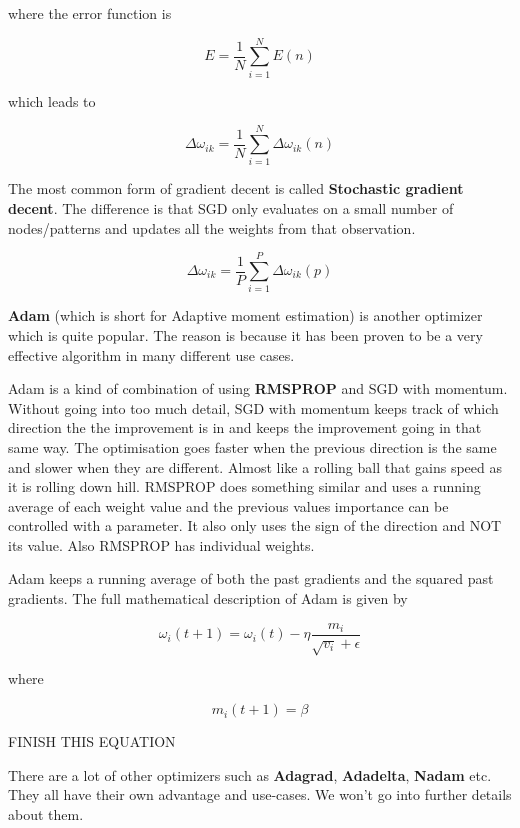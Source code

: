 \begin{center}
where the error function is
\end{center}

\[E = \frac{1}{N} \displaystyle\sum_{i=1}^{N} E(n) \]

\begin{center}
which leads to
\end{center}

\[ \Delta\omega_{ik} = \frac{1}{N}  \displaystyle\sum_{i=1}^{N} \Delta\omega_{ik}(n) \]

The most common form of gradient decent is called \textbf{Stochastic gradient decent}.
The difference is that SGD only evaluates on a small number of nodes/patterns and updates all the weights from that observation.

\[ \Delta\omega_{ik} = \frac{1}{P}  \displaystyle\sum_{i=1}^{P} \Delta\omega_{ik}(p) \]

\textbf{Adam} (which is short for Adaptive moment estimation) is another optimizer which is quite popular.
The reason is because it has been proven to be a very effective algorithm in many different use cases.

Adam is a kind of combination of using \textbf{RMSPROP} and SGD with momentum.
Without going into too much detail, SGD with momentum keeps track of which direction the the improvement is in and keeps the improvement going in that same way. The optimisation goes faster when the previous direction is the same and slower when they are different. Almost like a rolling ball that gains speed as it is rolling down hill.
RMSPROP does something similar and uses a running average of each weight value and the previous values importance can be controlled with a parameter. It also only uses the sign of the direction and NOT its value. Also RMSPROP has individual weights.

Adam keeps a running average of both the past gradients and the squared past gradients.
The full mathematical description of Adam is given by

\[ \omega_i (t+1) = \omega_i(t) - \eta \frac{m_i}{\sqrt{v_i} + \epsilon} \]

where

\[ m_i (t+1) = \beta \]

FINISH THIS EQUATION

There are a lot of other optimizers such as \textbf{Adagrad}, \textbf{Adadelta}, \textbf{Nadam} etc. They all have their own advantage and use-cases. We won't go into further details about them.


